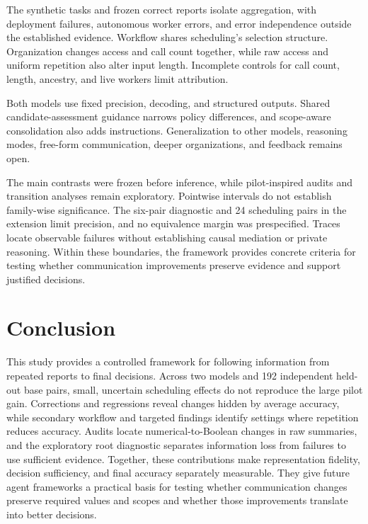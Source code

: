 \documentclass{svproc}
\begin{document}
The synthetic tasks and frozen correct reports isolate aggregation, with
deployment failures, autonomous worker errors, and error independence outside
the established evidence. Workflow shares scheduling's selection structure.
Organization changes access and call count together, while raw access and
uniform repetition also alter input length. Incomplete controls for call count,
length, ancestry, and live workers limit attribution.

Both models use fixed precision, decoding, and structured outputs. Shared
candidate-assessment guidance narrows policy differences, and scope-aware
consolidation also adds instructions. Generalization to other models, reasoning
modes, free-form communication, deeper organizations, and feedback remains open.

The main contrasts were frozen before inference, while pilot-inspired audits
and transition analyses remain exploratory. Pointwise intervals do not establish
family-wise significance. The six-pair diagnostic and 24 scheduling pairs in
the extension limit precision, and no equivalence margin was prespecified.
Traces locate observable failures without establishing causal mediation or
private reasoning. Within these boundaries, the framework provides concrete
criteria for testing whether communication improvements preserve evidence
and support justified decisions.


\section{Conclusion}
This study provides a controlled framework for following information from repeated reports to final decisions. Across two models and 192 independent held-out base pairs, small, uncertain scheduling effects do not reproduce the large pilot gain. Corrections and regressions reveal changes hidden by average accuracy, while secondary workflow and targeted findings identify settings where repetition reduces accuracy. Audits locate numerical-to-Boolean changes in raw summaries, and the exploratory root diagnostic separates information loss from failures to use sufficient evidence. Together, these contributions make representation fidelity, decision sufficiency, and final accuracy separately measurable. They give future agent frameworks a practical basis for testing whether communication changes preserve required values and scopes and whether those improvements translate into better decisions.


\FloatBarrier
\clearpage
\appendix
\end{document}
